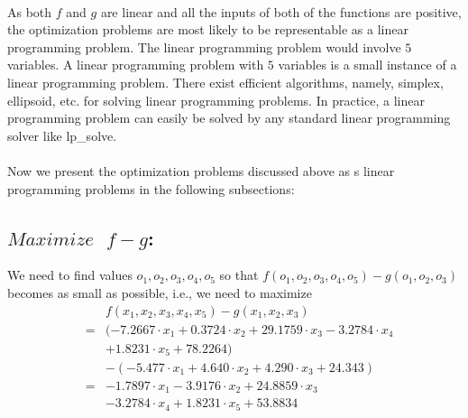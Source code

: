 \documentclass[12pt]{article}
\begin{document}
\paragraph{}
As both $f$ and $g$ are linear and all the inputs of both of the functions are positive, the optimization problems are most likely to be representable as a linear programming problem. The linear programming problem would involve $5$ variables. A linear programming problem with $5$ variables is a small instance of a linear programming problem. There exist efficient algorithms, namely, simplex, ellipsoid, etc. for solving linear programming problems. In practice, a linear programming problem can easily be solved by any standard linear programming solver like lp\_solve. 
\paragraph{}
Now we present the optimization problems discussed above as s linear programming problems in the following subsections:
\subsection{$Maximize \text{ }f - g$:}
We need to find values $o_1,o_2,o_3,o_4,o_5$ so that $f(o_1,o_2,o_3,o_4,o_5) - g(o_1,o_2,o_3)$ becomes as small as possible, i.e., we need to maximize
\begin{eqnarray*}
& & f(x_1,x_2,x_3,x_4,x_5) - g(x_1,x_2,x_3)\\
&=& (-7.2667 \cdot x_1 + 0.3724 \cdot x_2 + 29.1759 \cdot x_3 - 3.2784 \cdot x_4\\
& & + 1.8231 \cdot x_5 + 78.2264)\\
& & - (-5.477 \cdot x_1 + 4.640 \cdot x_2 + 4.290 \cdot x_3 + 24.343)\\
&=& -1.7897 \cdot x_1 - 3.9176 \cdot x_2 + 24.8859 \cdot x_3\\
& & - 3.2784 \cdot x_4 + 1.8231 \cdot x_5 + 53.8834
\end{eqnarray*}
\end{document}
